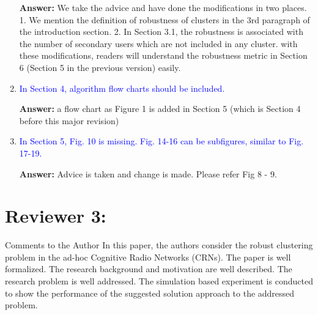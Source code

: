 \documentclass[10pt,a4paper]{article}
\begin{document}
\begin{enumerate}
\textbf{Answer:} We take the advice and have done the modifications in two places.
1. We mention the definition of robustness of clusters in the 3rd paragraph of the introduction section.
2. In Section 3.1, the robustness is associated with the number of secondary users which are not included in any cluster.
with these modifications, readers will understand the robustness metric in Section 6 (Section 5 in the previous version) easily. 


\item \textcolor{blue}{ In Section 4, algorithm flow charts should be included.}

\textbf{Answer:} a flow chart as Figure 1 is added in Section 5 (which is Section 4 before this major revision)

\item \textcolor{blue}{ In Section 5, Fig. 10 is missing. Fig. 14-16 can be subfigures, similar to Fig. 17-19.}

\textbf{Answer:} Advice is taken and change is made. Please refer Fig 8 - 9. 

\end{enumerate}

\section{Reviewer 3:}


Comments to the Author
In this paper, the authors consider the robust clustering problem in the ad-hoc Cognitive Radio Networks (CRNs). The paper is well formalized. The research background and motivation are well described. The research problem is well addressed. The simulation based experiment is conducted to show the performance of the suggested solution approach to the addressed problem.
\end{document}

